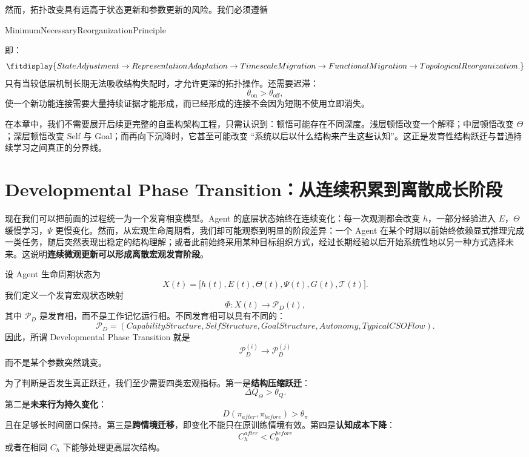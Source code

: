 然而，拓扑改变具有远高于状态更新和参数更新的风险。我们必须遵循
\begin{statementbox}
MinimumNecessaryReorganizationPrinciple
\end{statementbox}
即：
\[
\fitdisplay{
StateAdjustment
\rightarrow
RepresentationAdaptation
\rightarrow
TimescaleMigration
\rightarrow
FunctionalMigration
\rightarrow
TopologicalReorganization.
}
\]
只有当较低层机制长期无法吸收结构失配时，才允许更深的拓扑操作。还需要迟滞：
\[
\theta_{\mathrm{on}}
>
\theta_{\mathrm{off}},
\]
使一个新功能连接需要大量持续证据才能形成，而已经形成的连接不会因为短期不使用立即消失。

在本章中，我们不需要展开后续更完整的自重构架构工程，只需认识到：顿悟可能存在不同深度。浅层顿悟改变一个解释；中层顿悟改变 $\Theta$；深层顿悟改变 Self 与 Goal；而再向下沉降时，它甚至可能改变 ``系统以后以什么结构来产生这些认知''。这正是发育性结构跃迁与普通持续学习之间真正的分界线。

\section{Developmental Phase Transition：从连续积累到离散成长阶段}

现在我们可以把前面的过程统一为一个发育相变模型。Agent 的底层状态始终在连续变化：每一次观测都会改变 $h$，一部分经验进入 $E$，$\Theta$ 缓慢学习，$\Psi$ 更慢变化。然而，从宏观生命周期看，我们却可能观察到明显的阶段差异：一个 Agent 在某个时期以前始终依赖显式推理完成一类任务，随后突然表现出稳定的结构理解；或者此前始终采用某种目标组织方式，经过长期经验以后开始系统性地以另一种方式选择未来。这说明\textbf{连续微观更新可以形成离散宏观发育阶段}。

设 Agent 生命周期状态为
\[
X(t)
=
\big[
h(t),
E(t),
\Theta(t),
\Psi(t),
G(t),
\mathcal T(t)
\big].
\]
我们定义一个发育宏观状态映射
\[
\Phi:
X(t)
\rightarrow
\mathcal P_D(t),
\]
其中 $\mathcal P_D$ 是发育相，而不是工作记忆运行相。不同发育相可以具有不同的：
\[
\mathcal P_D
=
(
CapabilityStructure,
SelfStructure,
GoalStructure,
Autonomy,
TypicalCSOFlow
).
\]
因此，所谓 Developmental Phase Transition 就是
\[
\boxed{
\mathcal P_D^{(i)}
\rightarrow
\mathcal P_D^{(j)}
}
\]
而不是某个参数突然跳变。

为了判断是否发生真正跃迁，我们至少需要四类宏观指标。第一是\textbf{结构压缩跃迁}：
\[
\Delta Q_\Theta
>
\theta_Q.
\]
第二是\textbf{未来行为持久变化}：
\[
D(
\pi_{after},
\pi_{before}
)
>
\theta_\pi
\]
且在足够长时间窗口保持。第三是\textbf{跨情境迁移}，即变化不能只在原训练情境有效。第四是\textbf{认知成本下降}：
\[
C_h^{after}
<
C_h^{before}
\]
或者在相同 $C_h$ 下能够处理更高层次结构。

